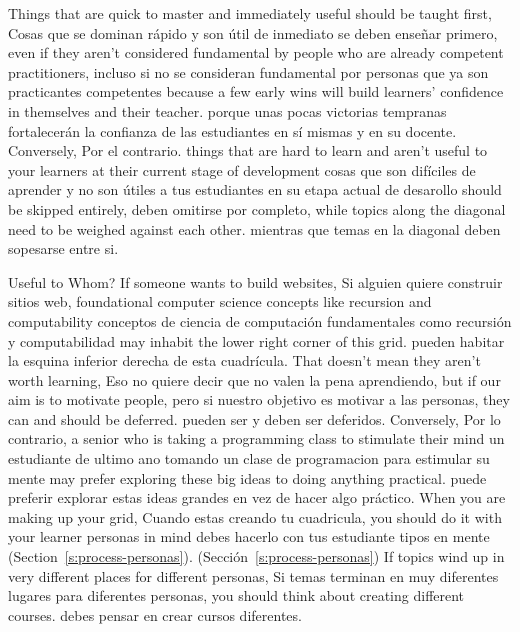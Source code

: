 
Things that are quick to master and immediately useful should be taught first,
Cosas que se dominan rápido y son útil de inmediato se deben enseñar primero,
even if they aren't considered fundamental by people who are already competent practitioners,
incluso si no se consideran fundamental por personas que ya son practicantes competentes
because a few early wins will build learners' confidence in themselves and their teacher.
porque unas pocas victorias tempranas fortalecerán la confianza de las estudiantes en sí mismas y en su docente.
Conversely,
Por el contrario.
things that are hard to learn and aren't useful to your learners at their current stage of development
cosas que son difíciles de aprender y no son útiles a tus estudiantes en su etapa actual de desarollo
should be skipped entirely,
deben omitirse por completo,
while topics along the diagonal need to be weighed against each other.
mientras que temas en la diagonal deben sopesarse entre si.

\newpage
\begin{aside}{Useful to Whom?}
  If someone wants to build websites,
  Si alguien quiere construir sitios web,
  foundational computer science concepts like recursion and computability
  conceptos de ciencia de computación fundamentales como recursión y computabilidad
  may inhabit the lower right corner of this grid.
  pueden habitar la esquina inferior derecha de esta cuadrícula. 
  That doesn't mean they aren't worth learning,
  Eso no quiere decir que no valen la pena aprendiendo,
  but if our aim is to motivate people,
  pero si nuestro objetivo es motivar a las personas,
  they can and should be deferred.
  pueden ser y deben ser deferidos.
  Conversely,
  Por lo contrario,
  a senior who is taking a programming class to stimulate their mind
  un estudiante de ultimo ano tomando un clase de programacion para estimular su mente
  may prefer exploring these big ideas to doing anything practical.
  puede preferir explorar estas ideas grandes en vez de hacer algo práctico.
  When you are making up your grid,
  Cuando estas creando tu cuadricula,
  you should do it with your learner personas in mind
  debes hacerlo con tus estudiante tipos en mente
  (Section~\ref{s:process-personas}).
  (Sección~\ref{s:process-personas})
  If topics wind up in very different places for different personas,
  Si temas terminan en muy diferentes lugares para diferentes personas,
  you should think about creating different courses.
  debes pensar en crear cursos diferentes.
\end{aside}

